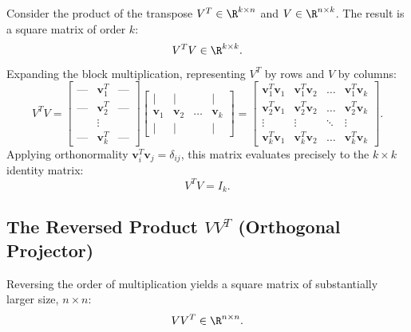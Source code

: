 Consider the product of the transpose $V^T \in \R^{k \times n}$ and $V \in \R^{n \times k}$. The result is a square matrix of order $k$:
\begin{equation}
    V^T V \in \R^{k \times k}.
\end{equation}
Expanding the block multiplication, representing $V^T$ by rows and $V$ by columns:
\begin{equation}
    V^T V = \begin{bmatrix} \text{---} & \mathbf{v}_1^T & \text{---} \\ \text{---} & \mathbf{v}_2^T & \text{---} \\ & \vdots & \\ \text{---} & \mathbf{v}_k^T & \text{---} \end{bmatrix} \begin{bmatrix} \mid & \mid & & \mid \\ \mathbf{v}_1 & \mathbf{v}_2 & \dots & \mathbf{v}_k \\ \mid & \mid & & \mid \end{bmatrix} = \begin{bmatrix} \mathbf{v}_1^T \mathbf{v}_1 & \mathbf{v}_1^T \mathbf{v}_2 & \dots & \mathbf{v}_1^T \mathbf{v}_k \\ \mathbf{v}_2^T \mathbf{v}_1 & \mathbf{v}_2^T \mathbf{v}_2 & \dots & \mathbf{v}_2^T \mathbf{v}_k \\ \vdots & \vdots & \ddots & \vdots \\ \mathbf{v}_k^T \mathbf{v}_1 & \mathbf{v}_k^T \mathbf{v}_2 & \dots & \mathbf{v}_k^T \mathbf{v}_k \end{bmatrix}.
\end{equation}
Applying orthonormality $\mathbf{v}_i^T \mathbf{v}_j = \delta_{ij}$, this matrix evaluates precisely to the $k \times k$ identity matrix:
\begin{equation}
    V^T V = I_k.
\end{equation}

\subsection{The Reversed Product \texorpdfstring{$V V^T$}{V V\textasciicircum T} (Orthogonal Projector)}

Reversing the order of multiplication yields a square matrix of substantially larger size, $n \times n$:
\begin{equation}
    V V^T \in \R^{n \times n}.
\end{equation}

